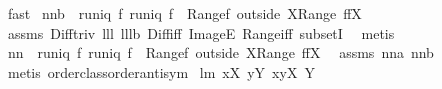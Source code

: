 \begin{isabellebody}
\ fast%
\endisatagproof
{\isafoldproof}%
%
\isadelimproof
\isanewline
%
\endisadelimproof
\isanewline
{}\isamarkupfalse%
\ nn{}{}b{\isacharcolon}\ \ {\isachardoublequoteopen}runiq\ f{\isachardoublequoteclose}\ {\isachardoublequoteopen}runiq\ {\isacharparenleft}f{\isacharcircum}{\isacharminus}{}{\isacharparenright}{\isachardoublequoteclose}\ \ {\isachardoublequoteopen}Range{\isacharparenleft}f\ outside\ X{\isacharparenright}{\isasymsubseteq}{\isacharparenleft}Range\ f{\isacharparenright}{\isacharminus}{\isacharparenleft}f{\isacharbackquote}{\isacharbackquote}X{\isacharparenright}{\isachardoublequoteclose}\ \isanewline
%
\isadelimproof
%
\endisadelimproof
%
\isatagproof
{}\isamarkupfalse%
\ assms\ Diff{\isacharunderscore}triv\ lll{}{}\ lll{}{}b\ Diff{\isacharunderscore}iff\ ImageE\ Range{\isacharunderscore}iff\ subsetI\ \isamarkupfalse%
\ metis%
\endisatagproof
{\isafoldproof}%
%
\isadelimproof
\ \isanewline
%
\endisadelimproof
{}\isamarkupfalse%
\ nn{}{}{\isacharcolon}\ \ {\isachardoublequoteopen}runiq\ f{\isachardoublequoteclose}\ {\isachardoublequoteopen}runiq\ {\isacharparenleft}f{\isacharcircum}{\isacharminus}{}{\isacharparenright}{\isachardoublequoteclose}\ \ {\isachardoublequoteopen}Range{\isacharparenleft}f\ outside\ X{\isacharparenright}{\isacharequal}{\isacharparenleft}Range\ f{\isacharparenright}{\isacharminus}{\isacharparenleft}f{\isacharbackquote}{\isacharbackquote}X{\isacharparenright}{\isachardoublequoteclose}\ \isanewline
%
\isadelimproof
%
\endisadelimproof
%
\isatagproof
{}\isamarkupfalse%
\ assms\ nn{}{}a\ nn{}{}b\ \isamarkupfalse%
\ {\isacharparenleft}metis\ order{\isacharunderscore}class{\isachardot}order{\isachardot}antisym{\isacharparenright}%
\endisatagproof
{\isafoldproof}%
%
\isadelimproof
\isanewline
%
\endisadelimproof
\isanewline
{}\isamarkupfalse%
\ lm{}{}{\isacharcolon}\ {\isachardoublequoteopen}{\isacharparenleft}{\isasymforall}x{\isasymin}X{\isachardot}\ {\isasymforall}y{\isasymin}Y{\isachardot}\ x{\isasyminter}y{\isacharequal}{\isacharbraceleft}{\isacharbraceright}{\isacharparenright}{\isacharequal}{\isacharparenleft}{\isasymUnion}X{\isasyminter}{\isacharparenleft}{\isasymUnion}\ Y{\isacharparenright}{\isacharequal}{\isacharbraceleft}{\isacharbraceright}{\isacharparenright}{\isachardoublequoteclose}%

\end{isabellebody}
